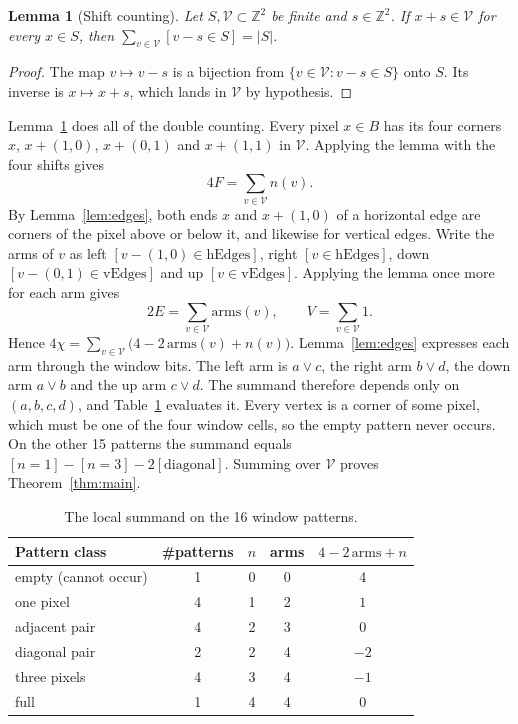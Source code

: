 \documentclass[11pt]{article}
\newtheorem{lemma}[theorem]{Lemma}
\theoremstyle{definition}
\theoremstyle{remark}
\begin{document}
\begin{lemma}[Shift counting]\label{lem:shift}
Let $S,\mathcal V\subset\mathbb{Z}^2$ be finite and $s\in\mathbb{Z}^2$. If $x+s\in\mathcal V$
for every $x\in S$, then $\sum_{v\in\mathcal V}[v-s\in S]=|S|$.
\end{lemma}
\begin{proof}
The map $v\mapsto v-s$ is a bijection from $\{v\in\mathcal V: v-s\in S\}$ onto
$S$. Its inverse is $x\mapsto x+s$, which lands in $\mathcal V$ by hypothesis.
\end{proof}

Lemma~\ref{lem:shift} does all of the double counting. Every pixel $x\in B$
has its four corners $x$, $x+(1,0)$, $x+(0,1)$ and $x+(1,1)$ in $\mathcal V$.
Applying the lemma with the four shifts gives
\[
  4F = \sum_{v\in\mathcal V} n(v).
\]
By Lemma~\ref{lem:edges}, both ends $x$ and $x+(1,0)$ of a horizontal edge are
corners of the pixel above or below it, and likewise for vertical edges.
Write the arms of $v$ as left $[v-(1,0)\in\mathrm{hEdges}]$, right
$[v\in\mathrm{hEdges}]$, down $[v-(0,1)\in\mathrm{vEdges}]$ and up
$[v\in\mathrm{vEdges}]$. Applying the lemma once more for each arm gives
\[
  2E = \sum_{v\in\mathcal V}\mathrm{arms}(v), \qquad V=\sum_{v\in\mathcal V}1 .
\]
Hence $4\chi = \sum_{v\in\mathcal V}\bigl(4-2\,\mathrm{arms}(v)+n(v)\bigr)$.
Lemma~\ref{lem:edges} expresses each arm through the window bits. The left arm
is $a\lor c$, the right arm $b\lor d$, the down arm $a\lor b$ and the up arm
$c\lor d$. The summand therefore depends only on $(a,b,c,d)$, and
Table~\ref{tab:patterns} evaluates it. Every vertex is a corner of some pixel,
which must be one of the four window cells, so the empty pattern never occurs.
On the other 15 patterns the summand equals
$[n=1]-[n=3]-2[\text{diagonal}]$. Summing over $\mathcal V$ proves
Theorem~\ref{thm:main}.

\begin{table}[h]
\centering
\begin{tabular}{lcccc}
\toprule
Pattern class & \#patterns & $n$ & arms & $4-2\,\mathrm{arms}+n$\\
\midrule
empty (cannot occur) & 1 & 0 & 0 & 4\\
one pixel & 4 & 1 & 2 & $1$\\
adjacent pair & 4 & 2 & 3 & $0$\\
diagonal pair & 2 & 2 & 4 & $-2$\\
three pixels & 4 & 3 & 4 & $-1$\\
full & 1 & 4 & 4 & $0$\\
\bottomrule
\end{tabular}
\caption{The local summand on the 16 window patterns.}
\label{tab:patterns}
\end{table}
\end{document}
